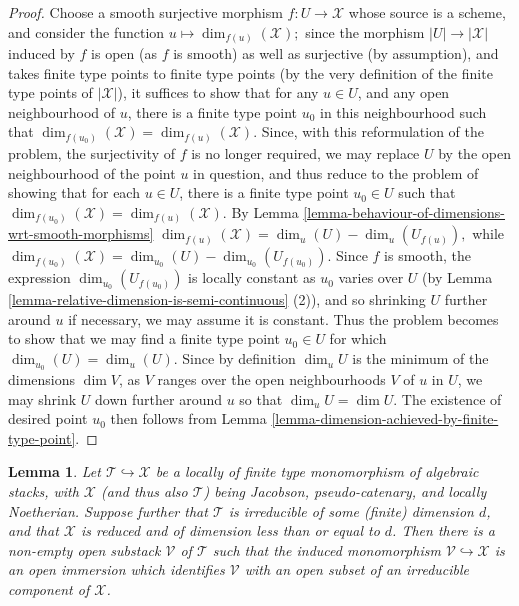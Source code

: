 \documentclass{stacks-project}
\theoremstyle{plain}
\newtheorem{lemma}[subsection]{Lemma}
\theoremstyle{definition}
\theoremstyle{remark}
\numberwithin{equation}{subsection}
\begin{document}
\begin{proof}
Choose a smooth surjective
morphism  $f:U \to \mathcal{X}$ whose source is a scheme, and consider the
function $u \mapsto \dim_{f(u)}(\mathcal{X});$
since the morphism $|U| \to |\mathcal{X}|$ induced by $f$ is open (as $f$
is smooth) as well as  surjective (by assumption),
and takes finite type points to finite type points (by the very definition
of the finite type points of $|\mathcal{X}|$),
it suffices to show that for any $u \in U$, and any open neighbourhood of $u$,
there is a finite type point $u_0$ in this neighbourhood such that
$\dim_{f(u_0)}(\mathcal{X}) = \dim_{f(u)}(\mathcal{X}).$
Since, with this reformulation
of the problem,  the surjectivity of $f$ is no longer required,
we may replace $U$ by the open neighbourhood of the point $u$ in question,
and thus reduce to the problem of showing that for each $u \in U$,
there is a finite type point $u_0 \in U$ such that
$\dim_{f(u_0)}(\mathcal{X}) = \dim_{f(u)}(\mathcal{X}).$
By Lemma \ref{lemma-behaviour-of-dimensions-wrt-smooth-morphisms}
$\dim_{f(u)}(\mathcal{X}) = \dim_u(U) - \dim_u(U_{f(u)}),$
while
$\dim_{f(u_0)}(\mathcal{X}) = \dim_{u_0}(U) - \dim_{u_0}(U_{f(u_0)}).$
Since $f$ is smooth, the expression $\dim_{u_0}(U_{f(u_0)})$ is locally
constant as $u_0$ varies over $U$ (by
Lemma \ref{lemma-relative-dimension-is-semi-continuous} (2)),
and so shrinking $U$ further around
$u$ if necessary, we may assume it is constant.  Thus the problem
becomes to show that we may find a finite type point $u_0 \in U$
for which $\dim_{u_0}(U) = \dim_u(U)$.
Since by definition $\dim_u U$ is the minimum of the dimensions
$\dim V$, as $V$ ranges over the open neighbourhoods $V$ of $u$
in $U$, we may shrink $U$ down further around $u$ so that
$\dim_u U = \dim U$.
The existence of desired point $u_0$ then follows from
Lemma \ref{lemma-dimension-achieved-by-finite-type-point}.
\end{proof}

\begin{lemma}
\label{lemma-monomorphing-a-component-in-of-the-right-dimension}
Let $\mathcal{T} \hookrightarrow \mathcal{X}$ be a locally
of finite type monomorphism of algebraic stacks,
with $\mathcal{X}$ (and thus also $\mathcal{T}$)
being Jacobson, pseudo-catenary, and locally Noetherian.
Suppose further that $\mathcal{T}$ is irreducible
of some (finite) dimension $d$, and that $\mathcal{X}$ is reduced
and of dimension less
than or equal to $d$.
Then there is a non-empty open substack $\mathcal{V}$ of $\mathcal{T}$ such
that the induced
monomorphism $\mathcal{V} \hookrightarrow \mathcal{X}$ is an open immersion
which identifies
$\mathcal{V}$ with an open subset of an irreducible component of $\mathcal{X}$.
\end{lemma}
\end{document}

